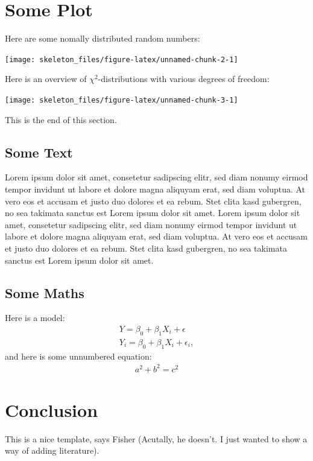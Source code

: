 \documentclass[oneside, 12pt, a4paper]{article}
\begin{document}
\section{Some Plot}

Here are some nomally distributed random numbers:

\begin{center}\texttt{[image: skeleton\_files/figure-latex/unnamed-chunk-2-1]} \end{center}

Here is an overview of \(\chi^2\)-distributions with various degrees of
freedom:

\begin{center}\texttt{[image: skeleton\_files/figure-latex/unnamed-chunk-3-1]} \end{center}

This is the end of this section.

\subsection{Some Text}

Lorem ipsum dolor sit amet, consetetur sadipscing elitr, sed diam nonumy
eirmod tempor invidunt ut labore et dolore magna aliquyam erat, sed diam
voluptua. At vero eos et accusam et justo duo dolores et ea rebum. Stet
clita kasd gubergren, no sea takimata sanctus est Lorem ipsum dolor sit
amet. Lorem ipsum dolor sit amet, consetetur sadipscing elitr, sed diam
nonumy eirmod tempor invidunt ut labore et dolore magna aliquyam erat,
sed diam voluptua. At vero eos et accusam et justo duo dolores et ea
rebum. Stet clita kasd gubergren, no sea takimata sanctus est Lorem
ipsum dolor sit amet.

\subsection{Some Maths}

Here is a model: \begin{align}
Y = \beta_0 + \beta_1 X_i + \epsilon \\
Y_i = \beta_0 + \beta_1 X_i + \epsilon_i ,
\end{align} and here is some unnumbered equation: \begin{align*}
a^2 + b^2 = c^2
\end{align*}

\section{Conclusion}

This is a nice template, says Fisher \cite{fisher_statistical_1970}
(Acutally, he doesn't. I just wanted to show a way of adding
literature).

\newpage
{}

\end{document}
